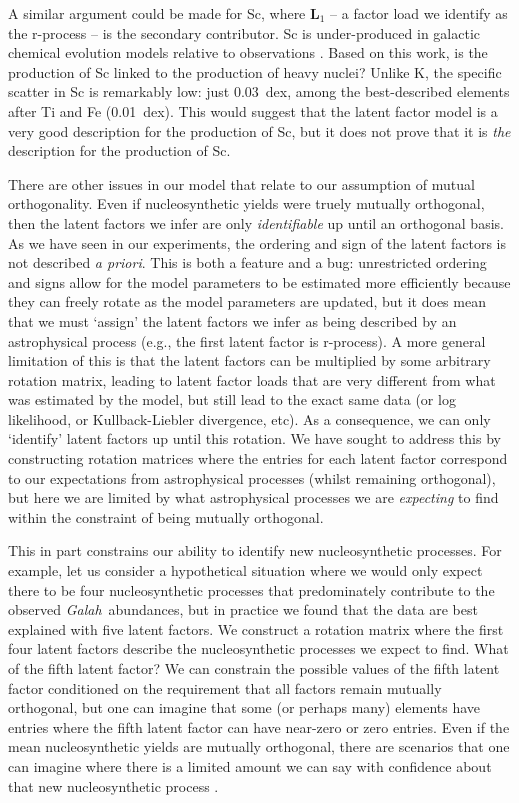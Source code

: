 \documentclass[twocolumn]{aastex62}
\newcommand{\project}[1]{\textsl{#1}}
\newcommand{\Galah}{\project{Galah}}
\begin{document}
A similar argument could be made for Sc, where $\mathbf{L}_1$ -- a factor load we
identify as the r-process -- is the secondary contributor. Sc is under-produced in 
galactic chemical evolution models relative to observations \citep{Kobayashi:2006,Casey:2015}.
Based on this work, is the production of Sc linked to the production of heavy nuclei? 
Unlike K, the specific scatter in Sc is remarkably low: just 0.03~dex, among the
best-described elements after Ti and Fe (0.01~dex). This would suggest that the
latent factor model is a very good description for the production of Sc, but it
does not prove that it is \emph{the} description for the production of Sc.


There are other issues in our model that relate to our assumption of mutual
orthogonality. Even if nucleosynthetic yields were truely mutually orthogonal,
then the latent factors we infer are only \emph{identifiable} up until an
orthogonal basis. As we have seen in our experiments, the ordering and sign 
of the latent factors is not described \emph{a priori}. This is both a feature
and a bug: unrestricted ordering and signs allow for the model parameters to be
estimated more efficiently because they can freely rotate as the model
parameters are updated, but it does mean that we
must `assign' the latent factors we infer as being described by an astrophysical
process (e.g., the first latent factor is r-process). A more general limitation
of this is that the latent factors can be multiplied by some arbitrary rotation
matrix, leading to latent factor loads that are very different from what was
estimated by the model, but still lead to the exact same data (or log likelihood,
or Kullback-Liebler divergence, etc). As a consequence, we can only `identify'
latent factors up until this rotation. We have sought to address this by constructing
rotation matrices where the entries for each latent factor correspond to our expectations
from astrophysical processes (whilst remaining orthogonal), but here we are limited
by what astrophysical processes we are \emph{expecting} to find within the constraint
of being mutually orthogonal.


This in part constrains our ability to identify new nucleosynthetic processes. For example,
let us consider a hypothetical situation where we would only expect there to be four 
nucleosynthetic processes that predominately contribute to the observed \Galah\ abundances,
but in practice we found that the data are best explained with
five latent factors. We construct a rotation matrix where the first four latent factors
describe the nucleosynthetic processes we expect to find. What of the fifth latent
factor? We can constrain the possible values of the fifth latent factor conditioned on
the requirement that all factors remain mutually orthogonal, but one can imagine that
some (or perhaps many) elements have entries where the fifth latent factor can have
near-zero or zero entries. Even if the mean nucleosynthetic yields are mutually
orthogonal, there are scenarios that one can imagine where there is a limited amount
we can say with confidence about that new nucleosynthetic process \citep[see also][]{Milosavljevic:2018}.
\end{document}
